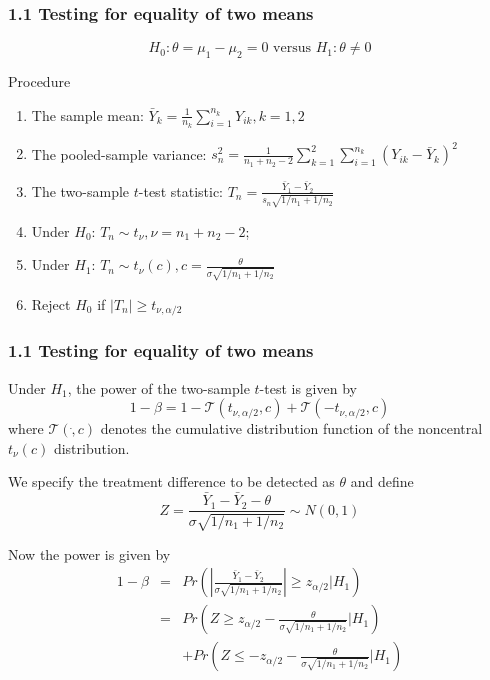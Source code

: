 \documentclass[table,10pt]{beamer}
\begin{document}
\begin{CJK*}{UTF8}{gbsn}
\begin{frame}
\frametitle{1.1 Testing for equality of two means}
$$
H_0: \theta = \mu_1 - \mu_2 = 0 \mbox{ versus } H_1: \theta \neq 0
$$

\begin{alertblock}{\center Procedure}
\begin{enumerate}
	\item The sample mean: $\bar{Y}_k = \frac{1}{n_k} \sum_{i=1}^{n_k} Y_{ik}, k=1,2$
	\item The pooled-sample variance: $s_n^2 = \frac{1}{n_1 + n_2 - 2} \sum_{k=1}^2 \sum_{i=1}^{n_k} (Y_{ik} - \bar{Y}_k)^2$
	\item The two-sample $t$-test statistic: $T_n = \frac{\bar{Y}_1 - \bar{Y}_2}{s_n \sqrt{1/n_1 + 1/n_2}}$
	\item Under $H_0$: $T_n \sim t_{\nu}, \nu = n_1 + n_2 - 2$;
	\item Under $H_1$: $T_n \sim t_{\nu}(c), c=\frac{\theta}{\sigma \sqrt{1/n_1 + 1/n_2}}$
	\item Reject $H_0$ if $|T_n| \ge t_{\nu, \alpha/2}$
\end{enumerate}
\end{alertblock}
\end{frame}


\begin{frame}[t]
\frametitle{1.1 Testing for equality of two means}
Under $H_1$, the power of the two-sample $t$-test is given by
$$
1 - \beta = 1 - \mathcal{T}(t_{\nu, \alpha/2}, c) + \mathcal{T}(-t_{\nu,\alpha/2}, c)
$$
where $\mathcal{T}(\dot,c)$ denotes the cumulative distribution function of the noncentral $t_{\nu}(c)$ distribution.

We specify the treatment difference to be detected as $\theta$ and define
$$
Z = \frac{\bar{Y}_1 - \bar{Y}_2 - \theta}{\sigma \sqrt{1/n_1 + 1/n_2}} \sim N(0, 1)
$$

Now the power is given by
$$
\begin{array}{lcl}
1 - \beta &=& Pr \left( |\frac{\bar{Y}_1 - \bar{Y}_2}{\sigma \sqrt{1/n_1 + 1/n_2}}| \ge z_{\alpha/2} \big| H_1\right)\\
&=& Pr \left( Z \ge z_{\alpha/2} - \frac{\theta}{\sigma\sqrt{1/n_1 + 1/n_2}} \big| H_1\right)\\
& & + Pr \left( Z \le -z_{\alpha/2} - \frac{\theta}{\sigma\sqrt{1/n_1 + 1/n_2}} \big| H_1\right)
\end{array}
$$ 

\end{frame}




\end{CJK*}
\end{document}
